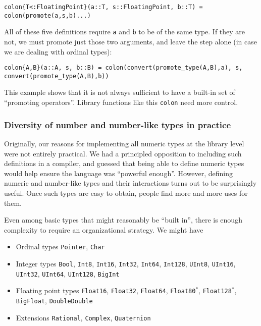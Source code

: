 \begin{verbatim}
colon{T<:FloatingPoint}(a::T, s::FloatingPoint, b::T) = colon(promote(a,s,b)...)
\end{verbatim}

All of these five definitions require \texttt{a} and \texttt{b} to be of the
same type. If they are not, we must promote just those two arguments, and leave
the step alone (in case we are dealing with ordinal types):

\begin{verbatim}
colon{A,B}(a::A, s, b::B) = colon(convert(promote_type(A,B),a), s, convert(promote_type(A,B),b))
\end{verbatim}

This example shows that it is not always sufficient to have a built-in set of
``promoting operators''. Library functions like this \texttt{colon} need more
control.

\subsubsection{Diversity of number and number-like types in practice}

Originally, our reasons for implementing all numeric types at the library
level were not entirely practical. We had a principled opposition to
including such definitions in a compiler, and guessed that being able to
define numeric types would help ensure the language was ``powerful enough''.
However, defining numeric and number-like types and their interactions turns
out to be surprisingly useful. Once such types are easy to obtain,
people find more and more uses for them.

Even among basic types that might reasonably be ``built in'', there is enough
complexity to require an organizational strategy. We might have

\begin{itemize}
  \item Ordinal types \texttt{Pointer}, \texttt{Char}

  \item Integer types \texttt{Bool}, \texttt{Int8}, \texttt{Int16}, \texttt{Int32}, \texttt{Int64}, \texttt{Int128}, \texttt{UInt8}, \texttt{UInt16}, \texttt{UInt32}, \texttt{UInt64}, \texttt{UInt128}, \texttt{BigInt}

  \item Floating point types \texttt{Float16}, \texttt{Float32}, \texttt{Float64}, \texttt{Float80}$^*$, \texttt{Float128}$^*$, \texttt{BigFloat}, \texttt{DoubleDouble}

  \item Extensions \texttt{Rational}, \texttt{Complex}, \texttt{Quaternion}
\end{itemize}

